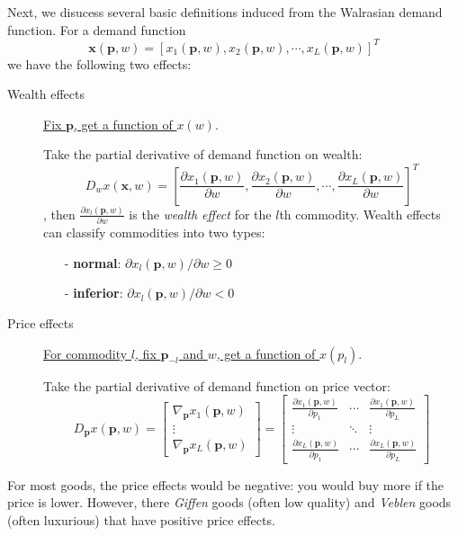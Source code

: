 Next, we disucess several basic definitions induced from the Walrasian demand function. For a demand function 
$$\mathbf{x}(\mathbf{p},w)=\left[x_1 (\mathbf{p},w),x_2 (\mathbf{p},w),\cdots, x_L(\mathbf{p},w) \right]^T$$ we have the following two effects:

\begin{description}
    \item[Wealth effects] \underline{Fix $\mathbf{p}$, get a function of $x(w)$}.
    
    Take the partial derivative of demand function on wealth: $$D_w x(\mathbf{x},w)=\left[\frac{\partial x_1(\mathbf{p},w)}{\partial w}, \frac{\partial x_2(\mathbf{p},w)}{\partial w},\cdots, \frac{\partial x_L(\mathbf{p},w)}{\partial w} \right]^T$$, then $\frac{\partial x_l(\mathbf{p},w)}{\partial w}$ is the \textit{wealth effect} for the $l$th commodity.
    Wealth effects can classify commodities into two types:
    \begin{enumerate}
        \item[-] \textbf{normal}: $\partial x_l(\mathbf{p},w)/\partial w\geq 0$
        \item[-] \textbf{inferior}: $\partial x_l(\mathbf{p},w)/\partial w <0$
    \end{enumerate} 
    \item[Price effects] \underline{For commodity $l$, fix $\mathbf{p}_{-l}$ and $w$, get a function of $x(p_l)$}.
    
    Take the partial derivative of demand function on price vector:
    $$D_{\mathbf{p}}x(\mathbf{p},w)= \begin{bmatrix}
        \nabla_{\mathbf{p}}x_1(\mathbf{p},w)\\
        \vdots\\
        \nabla_{\mathbf{p}}x_L(\mathbf{p},w) \end{bmatrix} 
    =
    \begin{bmatrix}
        \frac{\partial x_1(\mathbf{p},w)}{\partial p_1} & \cdots & \frac{\partial x_1(\mathbf{p},w)}{\partial p_L}\\
        \vdots & \ddots & \vdots\\
        \frac{\partial x_L(\mathbf{p},w)}{\partial p_1} & \cdots &\frac{\partial x_L(\mathbf{p},w)}{\partial p_L}
        \end{bmatrix}$$
\end{description}

For most goods, the price effects would be negative: you would buy more if the price is lower. However, there \textit{Giffen} goods (often low quality) and \textit{Veblen} goods (often luxurious) that have positive price effects.

